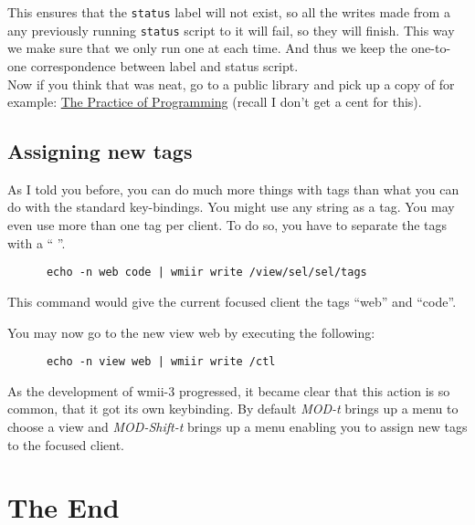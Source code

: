 \documentclass[12pt,a4paper]{article} %
\begin{document}
    This ensures that the \verb+status+ label will not exist, so all
    the writes made from a any previously running \verb+status+ script
    to it will fail, so they will finish. This way we make sure that
    we only run one at each time.  And thus we keep the one-to-one
    correspondence between label and status script.\\
  
    Now if you think that was neat, go to a public library and pick up
    a copy of for example: \href{http://tpop.awl.com}{The Practice of
    Programming} (recall I don't get a cent for this).
  
  \subsection{Assigning new tags}
  
    As I told you before, you can do much more things with tags than
    what you can do with the standard key-bindings. You might use any
    string as a tag. You may even use more than one tag per client. To
    do so, you have to separate the tags with a `` ''.

    \begin{verbatim}
      echo -n web code | wmiir write /view/sel/sel/tags
    \end{verbatim}

    This command would give the current focused client the tags
    ``web'' and ``code''.
    
    You may now go to the new view web by executing the following:

    \begin{verbatim}
      echo -n view web | wmiir write /ctl
    \end{verbatim}

    As the development of wmii-3 progressed, it became clear that this
    action is so common, that it got its own keybinding. By default
    \emph{MOD-t} brings up a menu to choose a view and
    \emph{MOD-Shift-t} brings up a menu enabling you to assign new
    tags to the focused client.


\section{The End}
\label{sec:end}
    
\end{document}

